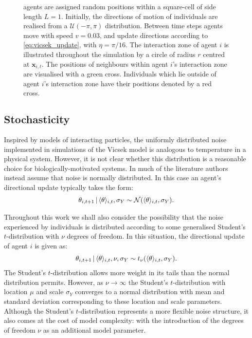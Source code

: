 \begin{figure}[tb]
{        agents are assigned random positions within a square-cell of side length $L=1$.
        Initially, the directions of motion of individuals are realised from a
        $\mathcal{U}(-\pi, \pi)$ distribution. Between time steps agents move with speed
        $v=0.03$, and update directions according to \cref{eq:vicsek_update}, with
        $\eta=\pi/16$. The interaction zone of agent $i$ is illustrated throughout the
        simulation by a circle of radius $r$ centred at $\bm{x}_{i,t}$. The positions of
        neighbours within agent $i$'s interaction zone are visualised with a green cross.
        Individuals which lie outside of agent $i$'s interaction zone have their positions
        denoted by a red cross.}
        \label{fig:vicsek_sim}
\end{figure}

\subsection{Stochasticity}

Inspired by models of interacting particles, the uniformly distributed noise implemented in
simulations of the Vicsek model is analogous to temperature in a physical system. However,
it is not clear whether this distribution is a reasonable choice for biologically-motivated
systems. In much of the literature authors instead assume that noise is normally
distributed. In this case an agent's directional update typically takes the form:
\begin{equation*}
    \theta_{i,t+1} \,|\, \langle\theta\rangle_{i,t}, \sigma_Y \sim
        \mathcal{N}(\langle\theta\rangle_{i,t}, \sigma_Y).
\end{equation*}

Throughout this work we shall also consider the possibility that the noise experienced by
individuals is distributed according to some generalised Student's $t$-distribution with
$\nu$ degrees of freedom. In this situation, the directional update of agent $i$ is given
as:
\begin{equation}
    \label{eq:students_update}
    \theta_{i,t+1} \,|\, \langle\theta\rangle_{i,t}, \nu, \sigma_Y \sim
    t_{\nu}(\langle\theta\rangle_{i,t}, \sigma_Y).
\end{equation}
The Student's $t$-distribution allows more weight in its tails than the normal
distribution permits. However, as $\nu\rightarrow\infty$ the Student's $t$-distribution
with location $\mu$ and scale $\sigma_Y$ converges to a normal distribution with mean and
standard deviation corresponding to these location and scale parameters.  Although the
Student's $t$-distribution represents a more flexible noise structure, it also comes at
the cost of model complexity: with the introduction of the degrees of freedom $\nu$ as an
additional model parameter.

